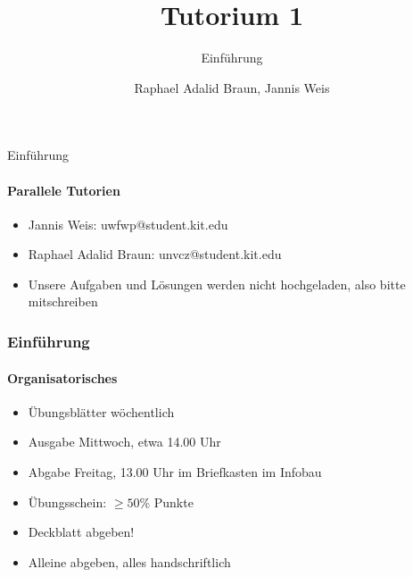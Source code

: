 \documentclass[18pt]{beamer}
\title[Tutorium GBI]{Tutorium 1}
\subtitle{Einführung}
\author{Raphael Adalid Braun, Jannis Weis}
\institute{Grundbegriffe der Informatik | WS 2018/19}
\begin{document}

\begin{frame}
 \titlepage
\end{frame}

\begin{frame}{Einführung}
 \framesubtitle{Parallele Tutorien}
 \begin{itemize}
  \item[]Jannis Weis: uwfwp@student.kit.edu
  \item[]Raphael Adalid Braun: unvcz@student.kit.edu
  \item[]Unsere Aufgaben und Lösungen werden nicht hochgeladen, also bitte mitschreiben
 \end{itemize}
\end{frame}
\begin{frame}
 \frametitle{Einführung}
 \framesubtitle{Organisatorisches}
 \begin{itemize}
  \item Übungsblätter wöchentlich
  \item Ausgabe Mittwoch, etwa 14.00 Uhr
  \item Abgabe Freitag, 13.00 Uhr im Briefkasten im Infobau
  \item Übungsschein: $\geq50\%$ Punkte
  \item Deckblatt abgeben!
  \item Alleine abgeben, alles handschriftlich
 \end{itemize}
\end{frame}
\end{document}
